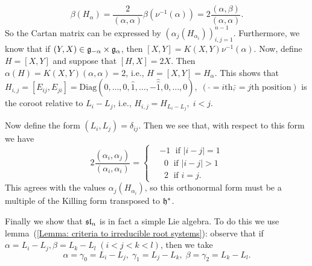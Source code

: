 \begin{equation}
    \beta(H_\alpha)=\frac{2}{(\alpha,\alpha)}\beta(\nu^{-1}(\alpha))=2\frac{(\alpha,\beta)}{(\alpha,\alpha)}.
\end{equation}
So the Cartan matrix can be expressed by $(\alpha_j(H_{\alpha_i}))_{i,j=1}^{n-1}$. Furthermore, we know that if
$(Y,X)\in\mathfrak{g}_{-\alpha}\times\mathfrak{g}_\alpha$, then $[X,Y]=K(X,Y)\nu^{-1}(\alpha)$. Now, define $H=[X,Y]$ and suppose that 
$[H,X]=2X$. Then $\alpha(H)=K(X,Y)(\alpha,\alpha)=2$, i.e., $H=[X,Y]=H_\alpha$. This shows that 
$H_{i,j}=[E_{ij}, E_{ji}]=\text{Diag}(0,\dots,0,\hat{1},\dots,-\hat{\hat{1}},0,\dots,0),\;(\;\hat{}=i\text{th},\hat{\hat{}}=j\text{th position})$ is 
 the coroot relative to $L_i-L_j$, i.e., $H_{i,j}=H_{L_i-L_j},\;i<j$.\par

 Now define the form $(L_i,L_j)=\delta_{ij}$. Then we see that, with respect to this form we have 
 \begin{equation}
    2\frac{(\alpha_i,\alpha_j)}{(\alpha_i,\alpha_i)}=\left\{\begin{aligned}
        &-1\;\text{ if }|i-j|=1\\
        &\;\;0\;\text{ if }|i-j|>1\\
        &\;\;2\;\text{ if }i=j.
    \end{aligned}\right.
 \end{equation}
 This agrees with the values $\alpha_j(H_{\alpha_i})$, so this orthonormal form must be a multiple of the Killing form transposed to 
 $\mathfrak{h}^*$.\par 

 Finally we show that $\mathfrak{sl}_n$ is in fact a simple Lie algebra. 
 To do this we use lemma~(\ref{Lemma: criteria to irreducible root systems}): observe that if $\alpha=L_i-L_j, \beta=L_k-L_l\;(i<j<k<l)$, then 
 we take 
 \begin{equation}
    \alpha=\gamma_0=L_i-L_j,\;  \gamma_1=L_j-L_k    ,\;\beta=\gamma_2 = L_k-L_l.
 \end{equation}

